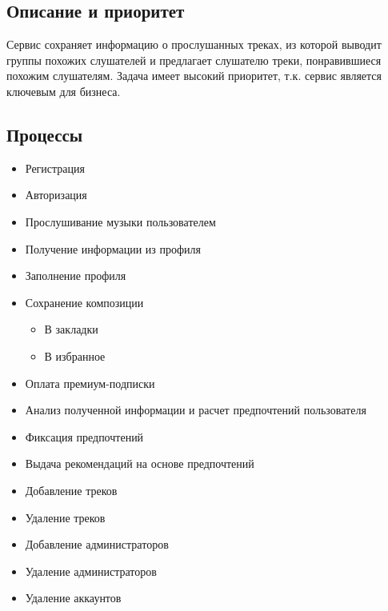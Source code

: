 \subsection{Описание и приоритет}
Сервис сохраняет информацию о прослушанных треках,
из которой выводит группы похожих слушателей
и предлагает слушателю треки, понравившиеся похожим слушателям.
Задача имеет высокий приоритет, т.к. сервис является ключевым для бизнеса.

\subsection{Процессы}
\begin{itemize}
    \item Регистрация
    \item Авторизация
    \item Прослушивание музыки пользователем
    \item Получение информации из профиля
    \item Заполнение профиля
    \item Сохранение композиции
    \begin{itemize}
        \item В закладки
        \item В избранное
    \end{itemize}
    \item Оплата премиум-подписки
    \item Анализ полученной информации и расчет предпочтений пользователя
    \item Фиксация предпочтений
    \item Выдача рекомендаций на основе предпочтений
    \item Добавление треков
    \item Удаление треков
    \item Добавление администраторов
    \item Удаление администраторов
    \item Удаление аккаунтов
\end{itemize}

